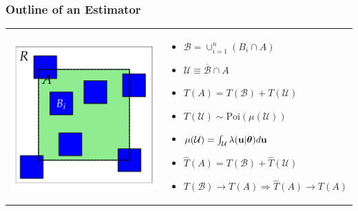 \documentclass[mathserif,compress]{beamer}\usepackage{graphicx, color}
\makeatletter
\def\maxwidth{ %
  \ifdim\Gin@nat@width>\linewidth
    \linewidth
  \else
    \Gin@nat@width
  \fi
}
\def\bu{\mathbf{u}}
\def\cB{\mathcal{B}}
\def\cU{\mathcal{U}}
\def\btheta{\mbox{\boldmath $\theta$}}
\def\Poi{\textrm{Poi}}
\makeatother
\begin{document}
\begin{frame}[fragile]
\frametitle{Outline of an Estimator}




	\begin{tabular}{p{4.0cm} p{5.5cm}}
		\vspace{.1cm}
		\includegraphics[width = \maxwidth]{figure/irregSamples-plot} &
		\vspace{-.1cm}
		\begin{itemize}
			\item $\cB = \cup_{i = 1}^n (B_i \cap A)$
			\item $\cU \equiv \overline{\cB} \cap A$
			\item $T(A) = T(\cB) + T(\cU)$
			\item $T(\cU) \sim \Poi(\mu(\cU))$
			\item $\mu(\cU)= \int_{\cU} \lambda(\bu|\btheta) d\bu$
			\item $\widehat{T}(A) = T(\cB) + \widehat{T}(\cU)$
			\footnotesize
			\item $T(\cB) \rightarrow T(A) \Rightarrow \widehat{T}(A) \rightarrow T(A)$
		\end{itemize}
	\end{tabular}

\end{frame}
\end{document}

